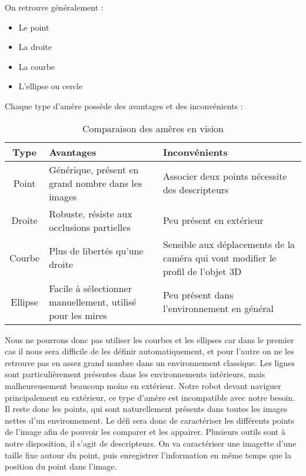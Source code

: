 On retrouve généralement :
\begin{itemize}
\item Le point
\item La droite
\item La courbe
\item L'ellipse ou cercle
\end{itemize}
Chaque type d'amère possède des avantages et des inconvénients :
\begin{table}[h]
  \begin{center}
    \begin{tabularx}{0.9\linewidth}{|c|X|X|}
      \hline
      \bf Type & \bf Avantages & \bf Inconvénients \\
      \hline
      Point & Générique, présent en grand nombre dans les images & Associer deux points nécessite des descripteurs\\
      \hline
      Droite & Robuste, résiste aux occlusions partielles & Peu présent en extérieur\\
      \hline
      Courbe & Plus de libertés qu'une droite & Sensible aux déplacements de la caméra qui vont modifier le profil de l'objet 3D\\
      \hline
      Ellipse & Facile à sélectionner manuellement, utilisé pour les mires & Peu présent dans l'environnement en général\\
      \hline
    \end{tabularx}    		
  \end{center}
  \caption{Comparaison des amères en vision}
\end{table}

Nous ne pourrons donc pas utiliser les courbes et les ellipses car dans le premier cas il nous sera difficile de les définir automatiquement, et pour l'autre on ne les retrouve pas en assez grand nombre dans un environnement classique.
Les lignes sont particulièrement présentes dans les environnements intérieurs, mais malheureusement beaucoup moins en extérieur.
Notre robot devant naviguer principalement en extérieur, ce type d'amère est incompatible avec notre besoin.
Il reste donc les points, qui sont naturellement présents dans toutes les images nettes d'un environnement.
Le défi sera donc de caractériser les différents points de l'image afin de pouvoir les comparer et les appairer.
Plusieurs outils sont à notre disposition, il s'agit de descripteurs.
On va caractériser une imagette d'une taille fixe autour du point, puis enregistrer l'information en même temps que la position du point dans l'image.

